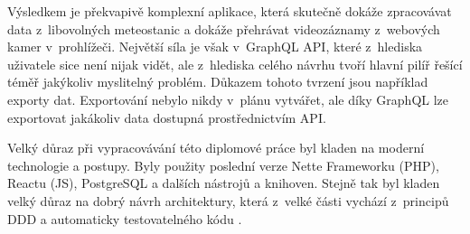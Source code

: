 Výsledkem je překvapivě komplexní aplikace, která skutečně dokáže zpracovávat data z~libovolných meteostanic a dokáže přehrávat videozáznamy z~webových kamer v~prohlížeči. Největší síla je však v~GraphQL API, které z~hlediska uživatele sice není nijak vidět, ale z~hlediska celého návrhu tvoří hlavní pilíř řešící téměř jakýkoliv myslitelný problém. Důkazem tohoto tvrzení jsou například exporty dat. Exportování nebylo nikdy v~plánu vytvářet, ale díky GraphQL lze exportovat jakákoliv data dostupná prostřednictvím API.

Velký důraz při vypracovávání této diplomové práce byl kladen na moderní technologie a postupy. Byly použity poslední verze Nette Frameworku (PHP), Reactu (JS), PostgreSQL a dalších nástrojů a knihoven. Stejně tak byl kladen velký důraz na dobrý návrh architektury, která z~velké části vychází z~principů DDD a automaticky testovatelného kódu \cite{ddd}.
